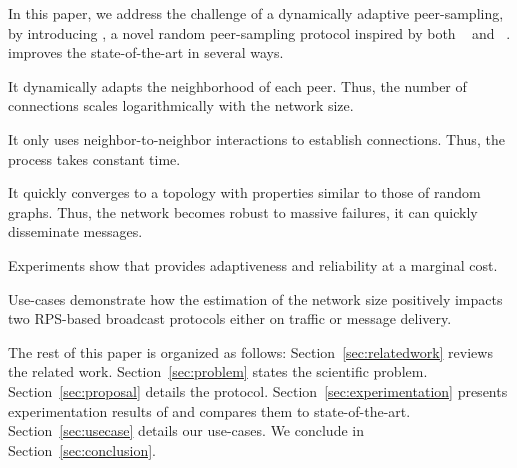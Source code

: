 In this paper, we address the challenge of a dynamically adaptive peer-sampling,
by introducing \SPRAY, a novel random peer-sampling protocol inspired by both
\SCAMP~\cite{ganesh2001scamp,ganesh2003peer} and
\CYCLON~\cite{voulgaris2005cyclon}. \SPRAY improves the state-of-the-art in
several ways.
\begin{inparaenum}[(i)]
\item It dynamically adapts the neighborhood of each peer. Thus, the number of
  connections scales logarithmically with the network size.
\item It only uses neighbor-to-neighbor interactions to establish
  connections. Thus, the process takes constant time.
\item It quickly converges to a topology with properties similar to
  those of random graphs. Thus, the network becomes robust to massive
  failures, it can quickly disseminate messages.
\item Experiments show that \SPRAY provides adaptiveness and reliability at a
  marginal cost.
\item Use-cases demonstrate how the estimation of the network size positively
  impacts two RPS-based broadcast protocols either on traffic or message
  delivery.
\end{inparaenum}

The rest of this paper is organized as follows: Section~\ref{sec:relatedwork}
reviews the related work. Section~\ref{sec:problem} states the scientific
problem. Section~\ref{sec:proposal} details the \SPRAY
protocol. Section~\ref{sec:experimentation} presents experimentation results of
\SPRAY and compares them to state-of-the-art. Section~\ref{sec:usecase} details
our use-cases. We conclude in Section~\ref{sec:conclusion}.




